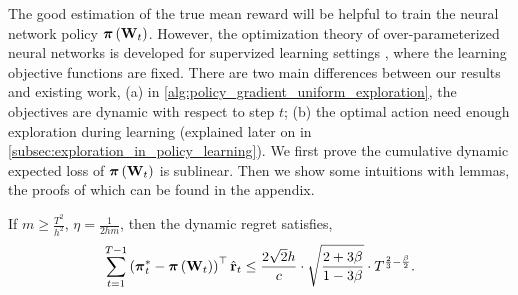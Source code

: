 The good estimation of the true mean reward will be helpful to train the neural network policy ${\boldsymbol{\pi}}\left( {\mathbf{W}}_t \right)$. However, the optimization theory of over-parameterized neural networks is developed for supervized learning settings \citep{li2018learning,allen2018convergenceB}, where the learning objective functions are fixed. There are two main differences between our results and existing work, (a) in \cref{alg:policy_gradient_uniform_exploration}, the objectives are dynamic with respect to step $t$; (b) the optimal action need enough exploration during learning (explained later on in \cref{subsec:exploration_in_policy_learning}). We first prove the cumulative dynamic expected loss of ${\boldsymbol{\pi}}\left( {\mathbf{W}}_t \right)$ is sublinear. Then we show some intuitions with lemmas, the proofs of which can be found in the appendix.
\begin{thm}
\label{thm:dynamic_regret_sublinear}
    If $m \ge \frac{T^2}{h^2}$, $\eta = \frac{1}{2 h m}$, then the dynamic regret satisfies,
\begin{equation*}
\begin{split}
    \sum\limits_{t=1}^{T-1}{ \left(  {{\boldsymbol{\pi}}_t^*} - {\boldsymbol{\pi}}\left( {\mathbf{W}}_t \right) \right)^\top \hat{{\mathbf{r}}}_t } \le \frac{2 \sqrt{2} h}{c} \cdot \sqrt{\frac{2 + 3 \beta}{1 - 3 \beta}} \cdot  T^{\frac{2}{3} - \frac{\beta}{2}}.
\end{split}
\end{equation*}
\end{thm}
